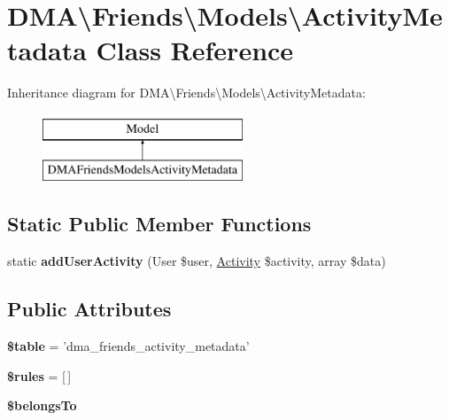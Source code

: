 \hypertarget{classDMA_1_1Friends_1_1Models_1_1ActivityMetadata}{\section{D\-M\-A\textbackslash{}Friends\textbackslash{}Models\textbackslash{}Activity\-Metadata Class Reference}
\label{classDMA_1_1Friends_1_1Models_1_1ActivityMetadata}
}
Inheritance diagram for D\-M\-A\textbackslash{}Friends\textbackslash{}Models\textbackslash{}Activity\-Metadata\-:\begin{figure}[H]
\begin{center}
\leavevmode
\includegraphics[height=2.000000cm]{de/d4f/classDMA_1_1Friends_1_1Models_1_1ActivityMetadata}
\end{center}
\end{figure}
\subsection*{Static Public Member Functions}
\begin{DoxyCompactItemize}
\item 
\hypertarget{classDMA_1_1Friends_1_1Models_1_1ActivityMetadata_aeebfd8f11220b629898c1c969714671c}{static {\bfseries add\-User\-Activity} (User \$user, \hyperlink{classDMA_1_1Friends_1_1Models_1_1Activity}{Activity} \$activity, array \$data)}\label{classDMA_1_1Friends_1_1Models_1_1ActivityMetadata_aeebfd8f11220b629898c1c969714671c}

\end{DoxyCompactItemize}
\subsection*{Public Attributes}
\begin{DoxyCompactItemize}
\item 
\hypertarget{classDMA_1_1Friends_1_1Models_1_1ActivityMetadata_a9c8aa7ea6d9f45141918ce6b7a570bc3}{{\bfseries \$table} = 'dma\-\_\-friends\-\_\-activity\-\_\-metadata'}\label{classDMA_1_1Friends_1_1Models_1_1ActivityMetadata_a9c8aa7ea6d9f45141918ce6b7a570bc3}

\item 
\hypertarget{classDMA_1_1Friends_1_1Models_1_1ActivityMetadata_a8038b90e92fe76cd7f7b86d32c8b01b8}{{\bfseries \$rules} = \mbox{[}$\,$\mbox{]}}\label{classDMA_1_1Friends_1_1Models_1_1ActivityMetadata_a8038b90e92fe76cd7f7b86d32c8b01b8}

\item 
{\bfseries \$belongs\-To}
\end{DoxyCompactItemize}

